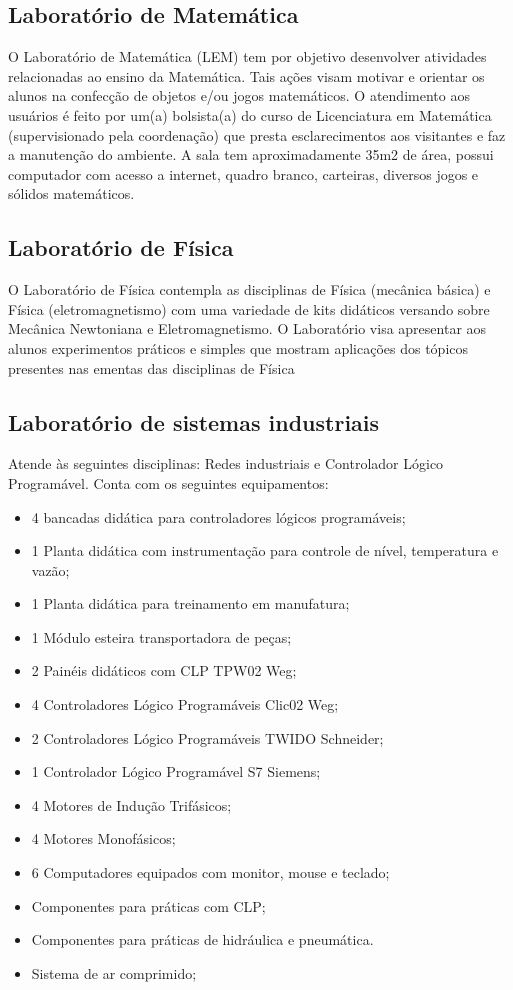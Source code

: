 \subsection{Laboratório de Matemática}
O Laboratório de Matemática (LEM) tem por objetivo desenvolver atividades relacionadas ao ensino da Matemática. Tais ações visam motivar e orientar os alunos na confecção de objetos e/ou jogos matemáticos. O atendimento aos usuários é feito por um(a) bolsista(a) do curso de Licenciatura em Matemática (supervisionado pela coordenação) que presta esclarecimentos aos visitantes e faz a manutenção do ambiente. A sala tem aproximadamente 35m2 de área, possui computador com acesso a internet, quadro branco, carteiras, diversos jogos e sólidos matemáticos.\\

\subsection{Laboratório de Física}
O Laboratório de Física contempla as disciplinas de Física (mecânica básica) e Física (eletromagnetismo) com uma variedade de kits didáticos versando sobre Mecânica Newtoniana e Eletromagnetismo. O Laboratório visa apresentar aos alunos experimentos práticos e simples que mostram aplicações dos tópicos presentes nas ementas das disciplinas de Física\\

\subsection{Laboratório de sistemas industriais}
Atende às seguintes disciplinas: Redes industriais e Controlador Lógico Programável. Conta com os seguintes equipamentos:\\

\begin{itemize}
\item 4 bancadas didática para controladores lógicos programáveis;
\item 1 Planta didática com instrumentação para controle de nível, temperatura e vazão;
\item 1 Planta didática para treinamento em manufatura;
\item 1 Módulo esteira transportadora de peças;
\item 2 Painéis didáticos com CLP TPW02 Weg;
\item 4 Controladores Lógico Programáveis Clic02 Weg;
\item 2 Controladores Lógico Programáveis TWIDO Schneider;
\item 1 Controlador Lógico Programável S7 Siemens;
\item 4 Motores de Indução Trifásicos;
\item 4 Motores Monofásicos;
\item 6 Computadores equipados com monitor, mouse e teclado;
\item Componentes para práticas com CLP;
\item Componentes para práticas de hidráulica e pneumática.
\item Sistema de ar comprimido;
\end{itemize}

